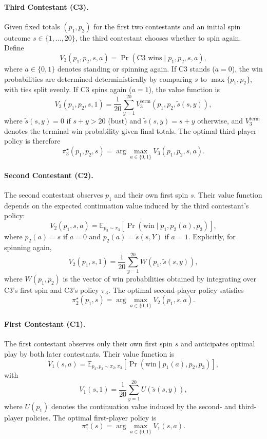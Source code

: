 \documentclass[titlepage,12pt]{article}
\begin{document}
\paragraph{Third Contestant (C3).}
Given fixed totals $(p_1,p_2)$ for the first two contestants and an initial spin outcome $s \in \{1,\ldots,20\}$, the third contestant chooses whether to spin again. Define
\[
V_3(p_1,p_2,s,a) = \Pr(\text{C3 wins} \mid p_1,p_2,s,a),
\]
where $a \in \{0,1\}$ denotes standing or spinning again. If C3 stands ($a=0$), the win probabilities are determined deterministically by comparing $s$ to $\max\{p_1,p_2\}$, with ties split evenly. If C3 spins again ($a=1$), the value function is
\[
V_3(p_1,p_2,s,1)
= \frac{1}{20} \sum_{y=1}^{20} V_3^{\text{term}}\!\left(p_1,p_2, \tilde{s}(s,y)\right),
\]
where $\tilde{s}(s,y)=0$ if $s+y>20$ (bust) and $\tilde{s}(s,y)=s+y$ otherwise, and $V_3^{\text{term}}$ denotes the terminal win probability given final totals. The optimal third-player policy is therefore
\[
\pi_3^\star(p_1,p_2,s)
= \arg\max_{a\in\{0,1\}} V_3(p_1,p_2,s,a).
\]

\paragraph{Second Contestant (C2).}
The second contestant observes $p_1$ and their own first spin $s$. Their value function depends on the expected continuation value induced by the third contestant’s policy:
\[
V_2(p_1,s,a)
= \mathbb{E}_{p_3 \sim \pi_3}\!\left[ \Pr(\text{win} \mid p_1, p_2(a), p_3) \right],
\]
where $p_2(a)=s$ if $a=0$ and $p_2(a)=\tilde{s}(s,Y)$ if $a=1$. Explicitly, for spinning again,
\[
V_2(p_1,s,1)
= \frac{1}{20} \sum_{y=1}^{20}
W\!\left(p_1,\tilde{s}(s,y)\right),
\]
where $W(p_1,p_2)$ is the vector of win probabilities obtained by integrating over C3’s first spin and C3’s policy $\pi_3$. The optimal second-player policy satisfies
\[
\pi_2^\star(p_1,s)
= \arg\max_{a\in\{0,1\}} V_2(p_1,s,a).
\]

\paragraph{First Contestant (C1).}
The first contestant observes only their own first spin $s$ and anticipates optimal play by both later contestants. Their value function is
\[
V_1(s,a)
= \mathbb{E}_{p_2,p_3 \sim \pi_2,\pi_3}
\left[ \Pr(\text{win} \mid p_1(a), p_2, p_3) \right],
\]
with
\[
V_1(s,1)
= \frac{1}{20} \sum_{y=1}^{20}
U\!\left(\tilde{s}(s,y)\right),
\]
where $U(p_1)$ denotes the continuation value induced by the second- and third-player policies. The optimal first-player policy is
\[
\pi_1^\star(s)
= \arg\max_{a\in\{0,1\}} V_1(s,a).
\]
\end{document}

